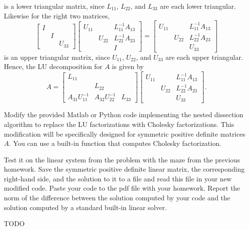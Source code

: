\documentclass{../../../kin_math}
\begin{document}
\begin{questions}
\begin{enumerate}
\begin{solution}
\begin{equation*}
      \end{equation*}
      is a lower triangular matrix, since $L_{11}$, $L_{22}$, and $L_{33}$ are each lower triangular. Likewise for the right two matrices,
      \begin{equation*}
        \begin{bmatrix} I & & \\ & I & \\ & & U_{33} \end{bmatrix} \begin{bmatrix} U_{11} & & L_{11}^{-1} A_{13} \\ & U_{22} & L_{22}^{-1} A_{23} \\ & & I \end{bmatrix} = \begin{bmatrix} U_{11} & & L_{11}^{-1} A_{13} \\ & U_{22} & L_{22}^{-1} A_{23} \\ & & U_{33} \end{bmatrix}
      \end{equation*}
      is an upper triangular matrix, since $U_{11}$, $U_{22}$, and $U_{33}$ are each upper triangular. Hence, the LU decomposition for $A$ is given by
      \begin{equation*}
        A = \begin{bmatrix} L_{11} & & \\ & L_{22} & \\ A_{31} U_{11}^{-1} & A_{32} U_{22}^{-1} & L_{33} \end{bmatrix} \begin{bmatrix} U_{11} & & L_{11}^{-1} A_{13} \\ & U_{22} & L_{22}^{-1} A_{23} \\ & & U_{33} \end{bmatrix}.
      \end{equation*}
    \end{solution}
  \end{enumerate}

  \question Modify the provided Matlab or Python code implementing the nested dissection algorithm to replace the LU factorizations with Cholesky factorizations. This modification will be specifically designed for symmetric positive definite matrices $A$. You can use a built-in function that computes Cholesky factorization.

  Test it on the linear system from the problem with the maze from the previous
  homework. Save the symmetric positive definite linear matrix, the corresponding
  right-hand side, and the solution to it to a file and read this file in your new modified code. Paste your code to the pdf file with your homework. Report the norm of the difference between the solution computed by your code and the solution computed by a standard built-in linear solver.
  \begin{solution}
    TODO
  \end{solution}


\end{questions}
\end{document}

